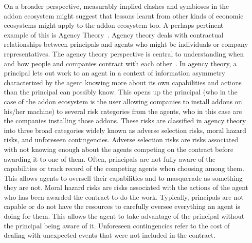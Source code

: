 \documentclass[10pt,letterpaper]{article}
\begin{document}
On a broader perspective, measurably implied clashes and symbioses in the addon ecosystem might suggest that lessons learnt from other kinds of economic ecosystems might apply to the addon ecosystem too. A perhaps pertinent example of this is Agency Theory~\cite{eisenhardt1989agency}. Agency theory deals with contractual relationships between principals and agents who might be individuals or company representatives. The agency theory perspective is central to understanding when and how people and companies contract with each other~\cite{bolton2005contract}. In agency theory, a principal lets out work to an agent in a context of information asymmetry characterized by the agent knowing more about its own capabilities and actions than the principal can possibly know. This opens up the principal (who in the case of the addon ecosystem is the user allowing companies to install addons on his/her machine) to several risk categories from the agents, who in this case are the companies installing those addons. These risks are classified in agency theory into three broad categories widely known as adverse selection risks, moral hazard risks, and unforeseen contingencies. Adverse selection risks are risks associated with not knowing enough about the agents competing on the contract before awarding it to one of them. Often, principals are not fully aware of the capabilities or track record of the competing agents when choosing among them. This allows agents to oversell their capabilities and to masquerade as something they are not. Moral hazard risks are risks associated with the actions of the agent who has been awarded the contract to do the work. Typically, principals are not capable or do not have the resources to carefully oversee everything an agent is doing for them. This allows the agent to take advantage of the principal without the principal being aware of it. Unforeseen contingencies refer to the cost of dealing with unexpected events that were not included in the contract. 
\end{document}
